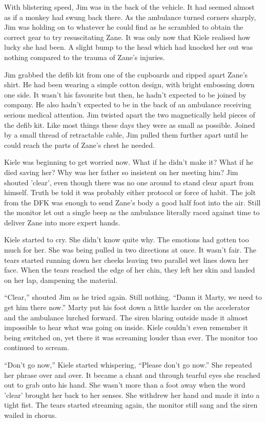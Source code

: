 With blistering speed, Jim was in the back of the vehicle.  It had seemed almost as if a monkey had swung back there.  As the ambulance turned corners sharply, Jim was holding on to whatever he could find as he scrambled to obtain the correct gear to try resuscitating Zane.  It was only now that Kiele realised how lucky she had been.  A slight bump to the head which had knocked her out was nothing compared to the trauma of Zane's injuries.  

Jim grabbed the defib kit from one of the cupboards and ripped apart Zane's shirt.  He had been wearing a simple cotton design, with bright embossing down one side.  It wasn't his favourite but then, he hadn't expected to be joined by company.  He also hadn't expected to be in the back of an ambulance receiving serious medical attention.  Jim twisted apart the two magnetically held pieces of the defib kit.  Like most things these days they were as small as possible.  Joined by a small thread of retractable cable,  Jim pulled them further apart until he could reach the parts of Zane's chest he needed.

Kiele was beginning to get worried now.  What if he didn't make it?  What if he died saving her?  Why was her father so insistent on her meeting him?  Jim shouted 'clear', even though there was no one around to stand clear apart from himself.  Truth be told it was probably either protocol or force of habit.  The jolt from the DFK was enough to send Zane's body a good half foot into the air.  Still the monitor let out a single beep as the ambulance literally raced against time to deliver Zane into more expert hands.  

Kiele started to cry.  She didn't know quite why.  The emotions had gotten too much for her.  She was being pulled in two directions at once.  It wasn't fair.  The tears started running down her cheeks leaving two parallel wet lines down her face.  When the tears reached the edge of her chin, they left her skin and landed on her lap, dampening the material.

``Clear,'' shouted Jim as he tried again.  Still nothing.  ``Damn it Marty, we need to get him there now.''  Marty put his foot down a little harder on the accelerator and the ambulance lurched forward.  The siren blaring outside made it almost impossible to hear what was going on inside.  Kiele couldn't even remember it being switched on, yet there it was screaming louder than ever.  The monitor too continued to scream.  

``Don't go now,'' Kiele started whispering, ``Please don't go now.''  She repeated her phrase over and over.  It became a chant and through tearful eyes she reached out to grab onto his hand.  She wasn't more than a foot away when the word 'clear' brought her back to her senses.  She withdrew her hand and made it into a tight fist.  The tears started streaming again, the monitor still sang and the siren wailed in chorus.



